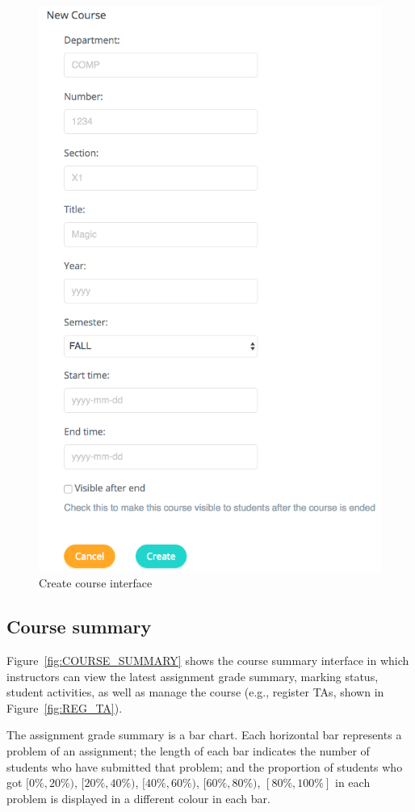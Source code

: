 \begin{figure}[H]
    \centering
        \includegraphics[width=.6\textwidth]{figures/create-courses}
    \caption{Create course interface}
    \label{fig:NEW_COURSE}
\end{figure}

\subsection{Course summary}
Figure~\ref{fig:COURSE_SUMMARY} shows the course summary interface in which
instructors can view the latest assignment grade summary, marking status,
student activities, as well as manage the course (e.g., register TAs, shown
in Figure~\ref{fig:REG_TA}).

The assignment grade summary is a bar chart. Each horizontal bar represents
a problem of an assignment; the length of each bar indicates the number
of students who have submitted that problem; and the proportion of students who
got $[0\%, 20\%)$, $[20\%, 40\%)$, $[40\%, 60\%)$, $[60\%, 80\%)$,
$[80\%, 100\%]$ in each problem is displayed in a different colour in each bar.

